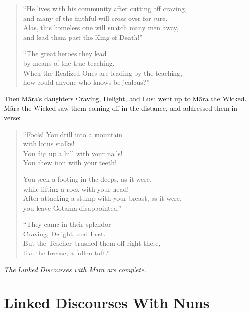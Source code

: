 \documentclass[12pt,openany]{book}%
\let\oldcontentsline\contentsline
\newcommand{\nopagecontentsline}[3]{\oldcontentsline{#1}{#2}{}}
\newcommand*{\scendsutta}[1]{\begin{center}\textit{#1}\end{center}}
\begin{document}
\begin{verse}%
“He lives with his community after cutting off craving, \\
and many of the faithful will cross over for sure. \\
Alas, this homeless one will snatch many men away, \\
and lead them past the King of Death!” 

“The great heroes they lead \\
by means of the true teaching. \\
When the Realized Ones are leading by the teaching, \\
how could anyone who knows be jealous?” 

%
\end{verse}

Then \textsanskrit{Māra}’s daughters Craving, Delight, and Lust went up to \textsanskrit{Māra} the Wicked. \textsanskrit{Māra} the Wicked saw them coming off in the distance, and addressed them in verse: 

\begin{verse}%
“Fools! You drill into a mountain \\
with lotus stalks! \\
You dig up a hill with your nails! \\
You chew iron with your teeth! 

You seek a footing in the deeps, as it were, \\
while lifting a rock with your head! \\
After attacking a stump with your breast, as it were, \\
you leave Gotama disappointed.” 

“They came in their splendor—\\
Craving, Delight, and Lust. \\
But the Teacher brushed them off right there, \\
like the breeze, a fallen tuft.” 

%
\end{verse}

\scendsutta{The Linked Discourses with \textsanskrit{Māra} are complete. }

%
\part*{Linked Discourses With Nuns }
\markboth{}{}
\addtocontents{toc}{\let\protect\contentsline\protect\oldcontentsline}
\end{document}
